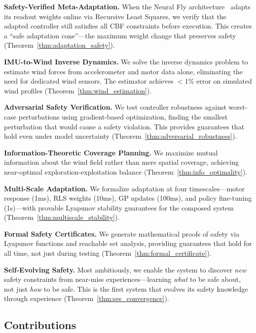 \textbf{Safety-Verified Meta-Adaptation.} When the Neural Fly architecture~\cite{dean2022neural} adapts its readout weights online via Recursive Least Squares, we verify that the adapted controller still satisfies all CBF constraints before execution. This creates a ``safe adaptation cone''---the maximum weight change that preserves safety (Theorem~\ref{thm:adaptation_safety}).

\textbf{IMU-to-Wind Inverse Dynamics.} We solve the inverse dynamics problem to estimate wind forces from accelerometer and motor data alone, eliminating the need for dedicated wind sensors. The estimator achieves $<1\%$ error on simulated wind profiles (Theorem~\ref{thm:wind_estimation}).

\textbf{Adversarial Safety Verification.} We test controller robustness against worst-case perturbations using gradient-based optimization, finding the smallest perturbation that would cause a safety violation. This provides guarantees that hold even under model uncertainty (Theorem~\ref{thm:adversarial_robustness}).

\textbf{Information-Theoretic Coverage Planning.} We maximize mutual information about the wind field rather than mere spatial coverage, achieving near-optimal exploration-exploitation balance (Theorem~\ref{thm:info_optimality}).

\textbf{Multi-Scale Adaptation.} We formalize adaptation at four timescales---motor response (1ms), RLS weights (10ms), GP updates (100ms), and policy fine-tuning (1s)---with provable Lyapunov stability guarantees for the composed system (Theorem~\ref{thm:multiscale_stability}).

\textbf{Formal Safety Certificates.} We generate mathematical proofs of safety via Lyapunov functions and reachable set analysis, providing guarantees that hold for all time, not just during testing (Theorem~\ref{thm:formal_certificate}).

\textbf{Self-Evolving Safety.} Most ambitiously, we enable the system to discover \emph{new} safety constraints from near-miss experiences---learning \emph{what} to be safe about, not just \emph{how} to be safe. This is the first system that evolves its safety knowledge through experience (Theorem~\ref{thm:ses_convergence}).

\subsection{Contributions}

